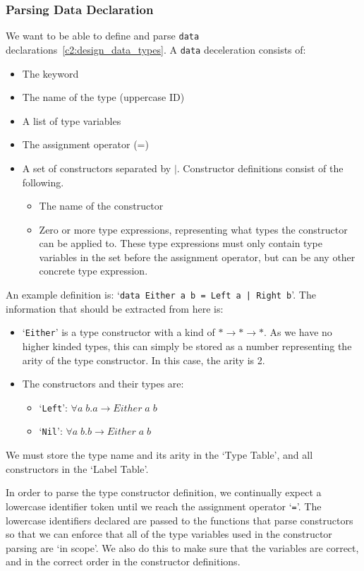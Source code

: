 \subsubsection{Parsing Data Declaration} 
We want to be able to define and parse \verb|data| declarations~\ref{c2:design_data_types}. A \verb|data| deceleration consists of: 
\begin{itemize}
    \item The  keyword
    \item The name of the type (uppercase ID)
    \item A list of type variables
    \item The assignment operator (=)
    \item A set of constructors separated by \(\mid\). Constructor definitions consist of the following. 
        \begin{itemize}
            \item The name of the constructor
            \item Zero or more type expressions, representing what types the constructor can be applied to. These type expressions must only contain type variables in the set before the assignment operator, but can be any other concrete type expression.  
        \end{itemize}
\end{itemize}

An example definition is: `\verb!data Either a b = Left a | Right b!'. The information that should be extracted from here is:
\begin{itemize}
    \item `\verb|Either|' is a type constructor with a kind of \(*\rightarrow* \rightarrow *\). As we have no higher kinded types, this can simply be stored as a number representing the arity of the type constructor. In this case, the arity is 2.
    \item The constructors and their types are:
    \begin{itemize}
        \item `\verb|Left|': \(\forall a\;b.a\rightarrow Either\;a\;b\)
        \item `\verb|Nil|': \(\forall a\;b.b\rightarrow Either\;a\;b\)
    \end{itemize}
\end{itemize}
We must store the type name and its arity in the `Type Table', and all constructors in the `Label Table'. 

In order to parse the type constructor definition, we continually expect a lowercase identifier token until we reach the assignment operator `\verb|=|'. The lowercase identifiers declared are passed to the functions that parse constructors so that we can enforce that all of the type variables used in the constructor parsing are `in scope'. We also do this to make sure that the variables are correct, and in the correct order in the constructor definitions. 

